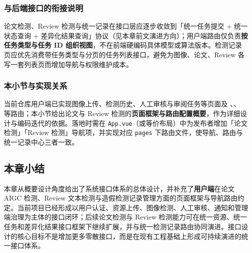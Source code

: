 \subsubsection{与后端接口的衔接说明}
论文检测、Review 检测与统一记录在接口层应逐步收敛到「统一任务提交 + 统一状态查询 + 差异化结果查询」协议（见本章前文演进方向）；用户端路由仅负责\textbf{按任务类型与任务 ID 组织视图}，不在前端硬编码具体模型或算法版本。检测记录页应优先消费带任务类型与分页的任务列表接口，避免为图像、论文、Review 各写一套列表页而增加导航与权限维护成本。

\subsubsection{本小节与实现关系}
当前仓库用户端已实现图像上传、检测历史、人工审核与审阅任务等页面及 、、 等路由；本小节给出论文与 Review 检测的\textbf{页面框架与路由配置概要}，作为详细设计与编码迭代的依据。落地时需在 \texttt{App.vue}（或等价布局）中为发布者增加「论文检测」「Review 检测」导航项，并实现对应 \texttt{pages} 下路由文件，使导航、路由与统一记录中心三者一致。

\subsection{本章小结}
本章从概要设计角度给出了系统接口体系的总体设计，并补充了\textbf{用户端}在论文 AIGC 检测、Review 文本检测与造假检测记录管理方面的页面框架与导航路由约定。当前项目已经形成以用户认证、资源上传、图像检测、人工审核、通知和管理端治理为主体的接口闭环；后续论文检测与 Review 检测能力可在统一资源、统一任务和差异化结果接口框架下继续扩展，并与统一检测记录路由协同演进。接口设计的核心目标不是增加更多零散接口，而是在现有工程基础上形成可持续演进的统一接口体系。

